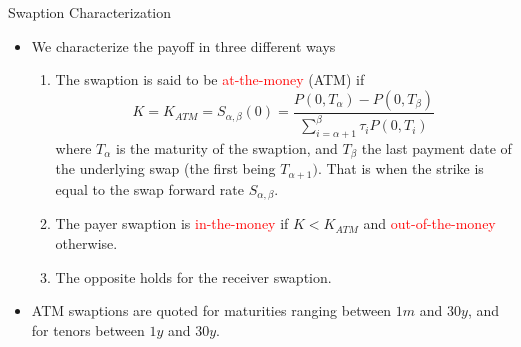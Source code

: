 \documentclass{beamer}
\begin{document}
\begin{frame}{Swaption Characterization}
	\begin{itemize}	
		\item<1-> We characterize the payoff in three different ways
		\begin{enumerate}
			\item<2-> The swaption is said to be \textcolor{red}{at-the-money} (ATM) if
			\begin{equation*}
				K = K_{ATM} = S_{\alpha,\beta}(0) = \frac{P(0,T_\alpha)-P(0,T_\beta)}{\sum_{i=\alpha+1}^\beta \tau_i P(0,T_i)}
			\end{equation*}
			where $T_\alpha$ is the maturity of the swaption, and $T_\beta$ the last payment date of the underlying swap (the first being $T_{\alpha+1})$. That is when the strike is equal to the swap forward rate $S_{\alpha,\beta}$.
			\item<3-> The payer swaption is \textcolor{red}{in-the-money} if $K<K_{ATM}$ and \textcolor{red}{out-of-the-money} otherwise.
			\item<4-> The opposite holds for the receiver swaption.
		\end{enumerate}
		\item<5-> ATM swaptions are quoted for maturities ranging between $1m$ and $30y$, and for tenors between $1y$ and $30y$.
	\end{itemize}
\end{frame}

%
\end{document}
